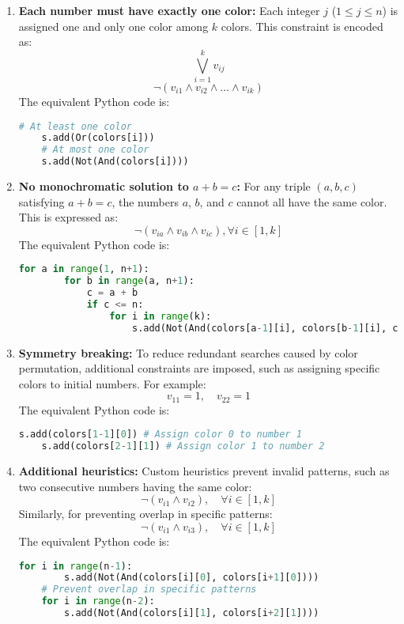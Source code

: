 \documentclass{article}
\begin{document}
\begin{enumerate}
    \item \textbf{Each number must have exactly one color:}
    Each integer \( j \) (\( 1 \leq j \leq n \)) is assigned one and only one color among \( k \) colors. This constraint is encoded as:
    \[
    \bigvee_{i=1}^{k} v_{ij}
    \]
    \[
    \neg(v_{i1} \land v_{i2} \land \ldots \land v_{ik})
    \]
    The equivalent Python code is:
    \begin{lstlisting}[language=Python]
    # At least one color
    s.add(Or(colors[i]))
    # At most one color
    s.add(Not(And(colors[i])))
    \end{lstlisting}

    \item \textbf{No monochromatic solution to \( a + b = c \):}
    For any triple \( (a, b, c) \) satisfying \( a + b = c \), the numbers \( a \), \( b \), and \( c \) cannot all have the same color. This is expressed as:
    \[
    \neg(v_{ia} \land v_{ib} \land v_{ic}), \forall i \in [1, k]
    \]
    The equivalent Python code is:
    \begin{lstlisting}[language=Python]
    for a in range(1, n+1):
        for b in range(a, n+1):
            c = a + b
            if c <= n:
                for i in range(k):
                    s.add(Not(And(colors[a-1][i], colors[b-1][i], colors[c-1][i])))
    \end{lstlisting}

    \item \textbf{Symmetry breaking:}
    To reduce redundant searches caused by color permutation, additional constraints are imposed, such as assigning specific colors to initial numbers. For example:
    \[
    v_{11} = 1, \quad v_{22} = 1
    \]
    The equivalent Python code is:
    \begin{lstlisting}[language=Python]
    s.add(colors[1-1][0]) # Assign color 0 to number 1
    s.add(colors[2-1][1]) # Assign color 1 to number 2
    \end{lstlisting}

    \item \textbf{Additional heuristics:}
    Custom heuristics prevent invalid patterns, such as two consecutive numbers having the same color:
    \[
    \neg(v_{i1} \land v_{i2}), \quad \forall i \in [1, k]
    \]
    Similarly, for preventing overlap in specific patterns:
    \[
    \neg(v_{i1} \land v_{i3}), \quad \forall i \in [1, k]
    \]
    The equivalent Python code is:
    \begin{lstlisting}[language=Python]
    for i in range(n-1):
        s.add(Not(And(colors[i][0], colors[i+1][0])))
    # Prevent overlap in specific patterns
    for i in range(n-2):
        s.add(Not(And(colors[i][1], colors[i+2][1])))
    \end{lstlisting}
\end{enumerate}
\end{document}
